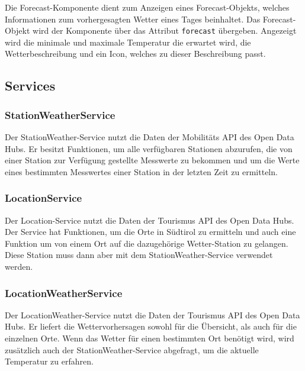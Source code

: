 \documentclass[a4paper,12pt]{article}
\begin{document}
Die Forecast-Komponente dient zum Anzeigen eines Forecast-Objekts, welches
Informationen zum vorhergesagten Wetter eines Tages beinhaltet. Das
Forecast-Objekt wird der Komponente über das Attribut \texttt{forecast}
übergeben. Angezeigt wird die minimale und maximale Temperatur die erwartet
wird, die Wetterbeschreibung und ein Icon, welches zu dieser Beschreibung passt.

\subsection{Services}
\subsubsection{StationWeatherService}
Der StationWeather-Service nutzt die Daten der Mobilitäts API des Open Data Hubs.
Er besitzt Funktionen, um alle verfügbaren Stationen abzurufen, die von einer
Station zur Verfügung gestellte Messwerte zu bekommen und um die Werte eines
bestimmten Messwertes einer Station in der letzten Zeit zu ermitteln.

\subsubsection{LocationService}
Der Location-Service nutzt die Daten der Tourismus API des Open Data Hubs. Der
Service hat Funktionen, um die Orte in Südtirol zu ermitteln und auch eine Funktion
um von einem Ort auf die dazugehörige Wetter-Station zu gelangen. Diese Station
muss dann aber mit dem StationWeather-Service verwendet werden.

\subsubsection{LocationWeatherService}
Der LocationWeather-Service nutzt die Daten der Tourismus API des Open Data Hubs.
Er liefert die Wettervorhersagen sowohl für die Übersicht, als auch für die
einzelnen Orte. Wenn das Wetter für einen bestimmten Ort benötigt wird, wird
zusätzlich auch der StationWeather-Service abgefragt, um die aktuelle Temperatur
zu erfahren.

\newpage
\nocite{*}


\end{document}
